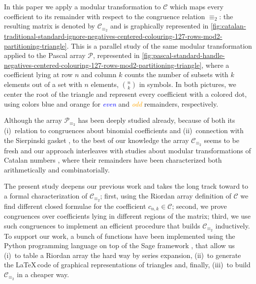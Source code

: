 In this paper we apply a modular transformation to $\mathcal{C}$ which maps
every coefficient to its remainder with respect to the congruence relation
$\equiv_{2}$: the resulting matrix is denoted by $\mathcal{C}_{\equiv_{2}}$ and
is graphically represented in
\autoref{fig:catalan-traditional-standard-ignore-negatives-centered-colouring-127-rows-mod2-partitioning-triangle}.
This is a parallel study of the same modular transformation applied to the
Pascal array $\mathcal{P}$, represented in
\autoref{fig:pascal-standard-handle-negatives-centered-colouring-127-rows-mod2-partitioning-triangle},
where a coefficient lying at row $n$ and column $k$ counts the number of
subsets with $k$ elements out of a set with $n$ elements, ${{n}\choose{k}}$ in
symbols.  In both pictures, we center the root of the triangle and represent
every coefficient with a colored dot, using colors blue and orange for
\textcolor{blue}{\emph{even}} and \textcolor{orange}{\emph{odd}} remainders,
respectively.

Although the array $\mathcal{P}_{\equiv_{2}}$ has been deeply studied already,
because of both its (i)~relation to congruences about binomial coefficients and
(ii)~connection with the Sierpinski gasket \cite{sokolov,
stewart:four:encounters:sierpinski}, to the best of our knowledge the array
$\mathcal{C}_{\equiv_{2}}$ seems to be fresh and our approach interleaves with
studies about modular transformations of Catalan numbers
\cite{alter:kubota:prime:power:catalan:divisibility,
egecioglu:parity:via:lattice:paths,
konvalinka:divisibility:generalized:catalan:numbers}, where their remainders 
have been characterized both arithmetically and combinatorially.  

The present study deepens our previous work \cite{merlini:nocentini:lecco} and
takes the long track toward to a formal characterization of
$\mathcal{C}_{\equiv_{2}}$; first, using the Riordan array definition of
$\mathcal{C}$ we find different closed formulae for the coefficient
$c_{n,k}\in\mathcal{C}$; second, we prove congruences over coefficients lying
in different regions of the matrix; third, we use such congruences to implement
an efficient procedure that builds $\mathcal{C}_{\equiv_{2}}$ inductively.
To support our work, a bunch of functions have been implemented using the
Python programming language on top of the Sage framework \cite{sage}, that
allow us (i)~to table a Riordan array the hard way by series expansion, (ii)~to
generate the \LaTeX\,code of graphical representations of triangles and, finally,
(iii)~to build $\mathcal{C}_{\equiv_{2}}$ in a cheaper way.

